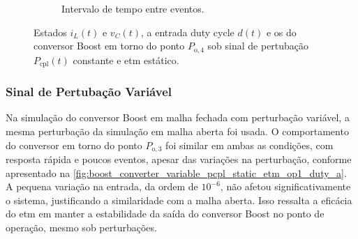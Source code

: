 \begin{figure}[H]
\begin{subfigure}{1.\textwidth}
    \caption{Intervalo de tempo entre eventos.}
    \label{fig:boost_converter_constant_pcpl_static_etm_op2_duty_c}
  \end{subfigure}
  \caption{Estados $i_L(t)$ e $v_C(t)$, a entrada duty cycle $d(t)$ e os  do conversor Boost em torno do ponto $P_{\mathrm{o}, 4}$ sob sinal de pertubação $P_{\mathrm{cpl}}(t)$ constante e \acrshort{etm} estático.}
\end{figure}

\subsubsection{Sinal de Pertubação Variável}

Na simulação do conversor Boost em malha fechada com perturbação variável, a mesma perturbação da simulação em malha aberta foi usada. O comportamento do conversor em torno do ponto $P_{\mathrm{o}, 3}$ foi similar em ambas as condições, com resposta rápida e poucos eventos, apesar das variações na perturbação, conforme apresentado na \autoref{fig:boost_converter_variable_pcpl_static_etm_op1_duty_a}. A pequena variação na entrada, da ordem de $10^{-6}$, não afetou significativamente o sistema, justificando a similaridade com a malha aberta. Isso ressalta a eficácia do \acrshort{etm} em manter a estabilidade da saída do conversor Boost no ponto de operação, mesmo sob perturbações.

